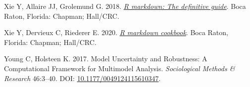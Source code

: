 \documentclass[10pt,a4paper]{article}
\newlength{\cslhangindent}
\newlength{\cslentryspacingunit} %
\newenvironment{CSLReferences}[2] %
 {%
  \setlength{\parindent}{0pt}
  \ifodd #1
  \let\oldpar\par
  \def\par{\hangindent=\cslhangindent\oldpar}
  \fi
  \setlength{\parskip}{#2\cslentryspacingunit}
 }%
 {}
\begin{document}
\begin{CSLReferences}{1}{0}
\leavevmode{}%
Xie Y, Allaire JJ, Grolemund G. 2018. \emph{\href{https://bookdown.org/yihui/rmarkdown}{R markdown: The definitive guide}}. Boca Raton, Florida: Chapman; Hall/CRC.

\leavevmode{}%
Xie Y, Dervieux C, Riederer E. 2020. \emph{\href{https://bookdown.org/yihui/rmarkdown-cookbook}{R markdown cookbook}}. Boca Raton, Florida: Chapman; Hall/CRC.

\leavevmode{}%
Young C, Holsteen K. 2017. Model {Uncertainty} and {Robustness}: {A} {Computational} {Framework} for {Multimodel} {Analysis}. \emph{Sociological Methods \& Research} 46:3--40. DOI: \href{https://doi.org/10.1177/0049124115610347}{10.1177/0049124115610347}.

\end{CSLReferences}
\end{document}
